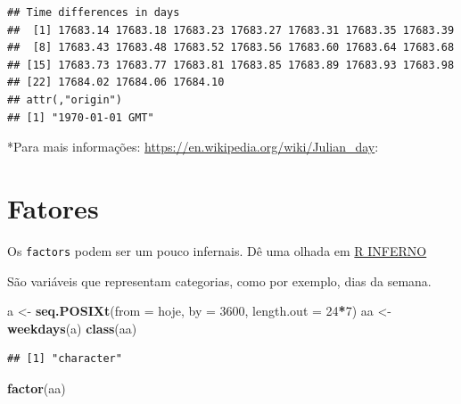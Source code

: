 \documentclass[]{book}
\newenvironment{Shaded}{\begin{snugshade}}{\end{snugshade}}
\newcommand{\KeywordTok}[1]{\textcolor[rgb]{0.13,0.29,0.53}{\textbf{#1}}}
\newcommand{\DataTypeTok}[1]{\textcolor[rgb]{0.13,0.29,0.53}{#1}}
\newcommand{\DecValTok}[1]{\textcolor[rgb]{0.00,0.00,0.81}{#1}}
\newcommand{\StringTok}[1]{\textcolor[rgb]{0.31,0.60,0.02}{#1}}
\newcommand{\OperatorTok}[1]{\textcolor[rgb]{0.81,0.36,0.00}{\textbf{#1}}}
\newcommand{\NormalTok}[1]{#1}
\theoremstyle{definition}
\theoremstyle{definition}
\theoremstyle{definition}
\theoremstyle{remark}
\begin{document}
\begin{verbatim}
## Time differences in days
##  [1] 17683.14 17683.18 17683.23 17683.27 17683.31 17683.35 17683.39
##  [8] 17683.43 17683.48 17683.52 17683.56 17683.60 17683.64 17683.68
## [15] 17683.73 17683.77 17683.81 17683.85 17683.89 17683.93 17683.98
## [22] 17684.02 17684.06 17684.10
## attr(,"origin")
## [1] "1970-01-01 GMT"
\end{verbatim}

*Para mais informações: \url{https://en.wikipedia.org/wiki/Julian_day}:

\section{Fatores}\label{fatores}

Os \texttt{factors} podem ser um pouco infernais. Dê uma olhada em
\href{http://www.burns-stat.com/documents/books/the-r-inferno/}{R
INFERNO}

São variáveis que representam categorias, como por exemplo, dias da
semana.

\begin{Shaded}
\begin{Highlighting}[]
\NormalTok{a <-}\StringTok{ }\KeywordTok{seq.POSIXt}\NormalTok{(}\DataTypeTok{from =}\NormalTok{ hoje, }\DataTypeTok{by =} \DecValTok{3600}\NormalTok{, }\DataTypeTok{length.out =} \DecValTok{24}\OperatorTok{*}\DecValTok{7}\NormalTok{)}
\NormalTok{aa <-}\StringTok{ }\KeywordTok{weekdays}\NormalTok{(a)}
\KeywordTok{class}\NormalTok{(aa)}
\end{Highlighting}
\end{Shaded}

\begin{verbatim}
## [1] "character"
\end{verbatim}

\begin{Shaded}
\begin{Highlighting}[]
\KeywordTok{factor}\NormalTok{(aa)}
\end{Highlighting}
\end{Shaded}
\end{document}
